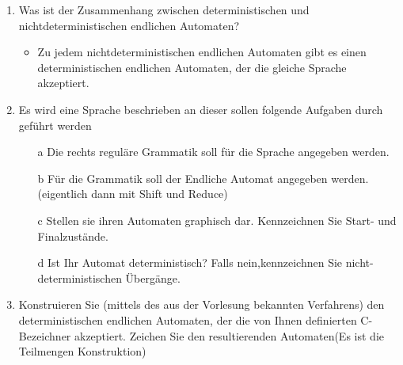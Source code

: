 \documentclass[
  ngerman
  ,12pt
  ,pdftex
]{article}
\begin{document}
\begin{enumerate}
\begin{itemize}
  \end{itemize}
  \item Was ist der Zusammenhang zwischen deterministischen und nichtdeterministischen endlichen Automaten?
  \begin{itemize}
    \item Zu jedem nichtdeterministischen endlichen Automaten gibt es einen deterministischen endlichen Automaten, der die gleiche Sprache akzeptiert.
  \end{itemize}
  \item  Es wird eine Sprache beschrieben an dieser sollen folgende Aufgaben durch geführt werden
  \begin{itemize}
    \item [a] Die rechts reguläre Grammatik soll für die Sprache angegeben werden.
    \item [b] Für die Grammatik soll der Endliche Automat angegeben werden. (eigentlich dann mit Shift und Reduce)
    \item [c] Stellen sie ihren Automaten graphisch dar. Kennzeichnen Sie Start- und Finalzustände.
    \item [d] Ist Ihr Automat deterministisch? Falls nein,kennzeichnen Sie nicht-deterministischen Übergänge.
  \end{itemize}
  \item Konstruieren Sie (mittels des aus der Vorlesung bekannten Verfahrens) den deterministischen
  endlichen Automaten, der die von Ihnen definierten C-Bezeichner akzeptiert. Zeichen Sie den resultierenden
  Automaten(Es ist die Teilmengen Konstruktion)
\end{enumerate}
\end{document}
